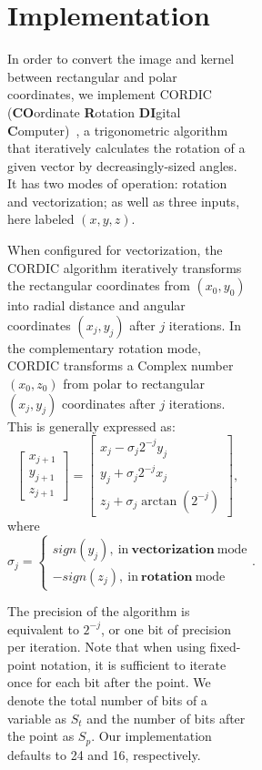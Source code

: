 \begin{figure}[!tb]
\begin{figure}[!tb]
\begin{figure}[!tb]
\section{Implementation}\label{sec:imp}
  In order to convert the image and kernel between rectangular and polar coordinates, we implement CORDIC ({\bf{CO}}ordinate {\bf{R}}otation {\bf{DI}}gital {\bf{C}}omputer)~\cite{volder1959cordic}, a trigonometric algorithm that iteratively calculates the rotation of a given vector by decreasingly-sized angles. It has two modes of operation: rotation and vectorization; as well as three inputs, here labeled $(x,y,z)$. 

  When configured for vectorization, the CORDIC algorithm iteratively transforms the rectangular coordinates from $(x_0,y_0)$ into radial distance and angular coordinates $(x_j,y_j)$ after $j$ iterations. In the complementary rotation mode, CORDIC transforms a Complex number $(x_0,z_0)$ from polar to rectangular $(x_j,y_j)$ coordinates after $j$ iterations. This is generally expressed as:
  \begin{equation}\label{eq:cordic1}
    \begin{bmatrix}
      x_{j+1} \\
      y_{j+1} \\
      z_{j+1}
    \end{bmatrix}
    =
    \begin{bmatrix}
      x_{j} - \sigma_{j}2^{-j}y_{j} \\
      y_{j} + \sigma_{j}2^{-j}x_{j} \\
      z_{j} + \sigma_{j}\arctan(2^{-j})
    \end{bmatrix},
  \end{equation}
  where
  \begin{equation}\label{eq:cordic2}
    \sigma_j = 
    \begin{cases}
      sign(y_j),~\text{in}~\textbf{vectorization}~\text{mode} \\
      -sign(z_j),~\text{in}~\textbf{rotation}~\text{mode}
    \end{cases}.
  \end{equation}

  The precision of the algorithm is equivalent to $2^{-j}$, or one bit of precision per iteration. Note that when using fixed-point notation, it is sufficient to iterate once for each bit after the point. We denote the total number of bits of a variable as $S_t$ and the number of bits after the point as $S_p$. Our implementation defaults to 24 and 16, respectively.


\end{figure}
\end{figure}
\end{figure}
